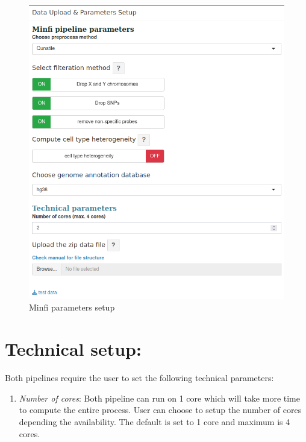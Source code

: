 \documentclass[
  a4paper,
  oneside,
  open=any]{scrreport}
\providecommand{\tightlist}{%
  \setlength{\itemsep}{0pt}\setlength{\parskip}{0pt}}\usepackage{longtable,booktabs,array}
\begin{document}
\begin{figure}[H]

{\centering \includegraphics{./_images/methylysis_03.png}

}

\caption{Minfi parameters setup}

\end{figure}

\hypertarget{technical-setup}{%
\section{Technical setup:}\label{technical-setup}}

Both pipelines require the user to set the following technical
parameters:

\begin{enumerate}
\def\labelenumi{\arabic{enumi}.}
\tightlist
\item
  \emph{Number of cores}: Both pipeline can run on 1 core which will
  take more time to compute the entire process. User can choose to setup
  the number of cores depending the availability. The default is set to
  1 core and maximum is 4 cores.
\end{enumerate}
\end{document}
